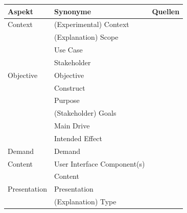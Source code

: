 \begin{table}
        \begin{tabular}{|p{}|p{}|p{}|}
            \hline
            \textbf{Aspekt}          & \textbf{Synonyme} & \textbf{Quellen} \\ \hline
            Context         & (Experimental) Context & \cite{chazette_knowledge_nodate} \cite{chazette_end-users_nodate} \cite{sato_context_nodate} \cite{waa_evaluating_2021} \cite{kohl_explainability_2019} \cite{neerincx_using_2018} \cite{sovrano_modelling_2020} \cite{doshi2017towards} \\
                            & (Explanation) Scope & \cite{wohlin2012experimentation} \cite{eiband_impact_2019} \cite{doshi2017towards} \\
                            & Use Case & \cite{waa_evaluating_2021} \\
                            & Stakeholder & \cite{rosenfeld_explainability_2019} \\
            \hline
            Objective       & Objective & \cite{nunes_systematic_2017} \\
                            & Construct & \cite{waa_evaluating_2021} \\
                            & Purpose & \cite{nunes_systematic_2017} \cite{wohlin2012experimentation} \\
                            & (Stakeholder) Goals & \cite{cirqueira_scenario-based_2020} \cite{sovrano_modelling_2020} \cite{ribera2019can} \\
                            & Main Drive & \cite{anjomshoae2019explainable} \\
                            & Intended Effect & \cite{balog_measuring_2020} \\
            \hline
            Demand          & Demand            & \cite{chazette_knowledge_nodate} \\
            \hline
            Content         & User Interface Component(s) & \cite{nunes_systematic_2017}
                                                            \cite{rosenfeld_explainability_2019} \\
                            & Content               & \cite{ribera2019can} \\
            \hline
            Presentation    & Presentation          & \cite{rosenfeld_explainability_2019,kouki_user_2017} \\
                            & (Explanation) Type    & \cite{ribera2019can} \cite{rosenfeld_explainability_2019} \\

\end{tabular}
\end{table}
